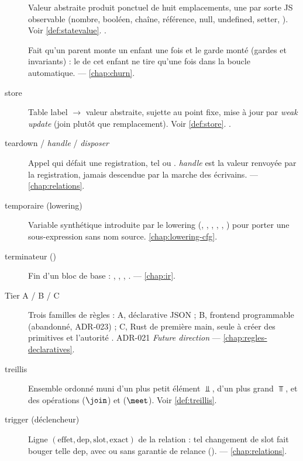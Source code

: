 \begin{description}
\item[] Valeur abstraite produit ponctuel de huit emplacements, une par sorte JS observable (nombre, booléen, chaîne, référence, null, undefined, setter, ). Voir \cref{def:statevalue}. .

\item[] Fait qu'un parent monte un enfant une fois et le garde monté (gardes et  invariants) : le \code{[]} de cet enfant ne tire qu'une fois dans la boucle automatique.  — \cref{chap:churn}.

\item[store] Table label \(\to\) valeur abstraite, sujette au point fixe, mise à jour par \emph{weak update} (\og join\fg{} plutôt que remplacement). Voir \cref{def:store}. .

\item[teardown / \emph{handle} / \emph{disposer}] Appel qui défait une registration, tel  ou . \emph{handle} est la valeur renvoyée par la registration, jamais descendue par la marche des écrivains.  — \cref{chap:relations}.

\item[temporaire (lowering)] Variable synthétique introduite par le lowering (, , , , , ) pour porter une sous-expression sans nom source. \cref{chap:lowering-cfg}.

\item[terminateur ()] Fin d'un bloc de base : , , , .  — \cref{chap:ir}.

\item[Tier A / B / C] Trois familles de règles : A, déclarative JSON ; B, frontend programmable (abandonné, ADR-023) ; C, Rust de première main, seule à créer des primitives et l'autorité \Error{}. ADR-021 \emph{Future direction} — \cref{chap:regles-declaratives}.

\item[treillis] Ensemble ordonné muni d'un plus petit élément \(\Bot\), d'un plus grand \(\Top\), et des opérations  (\(\join\)) et  (\(\meet\)). Voir \cref{def:treillis}.

\item[trigger (déclencheur)] Ligne \(( \text{effet}, \text{dep}, \text{slot}, \text{exact})\) de la relation  : tel changement de slot fait bouger telle dep, avec ou sans garantie de relance ().  — \cref{chap:relations}.


\end{description}
